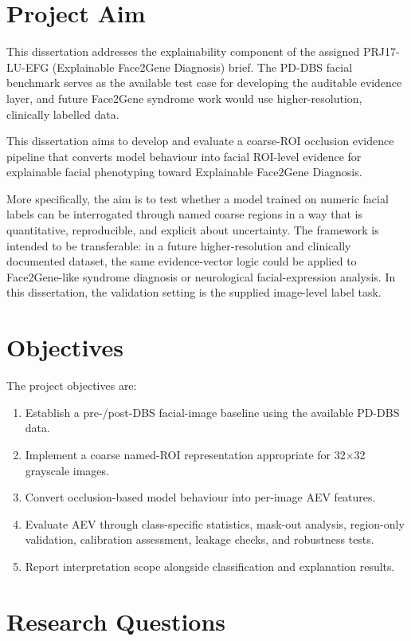 \section{Project Aim}

This dissertation addresses the explainability component of the assigned PRJ17-LU-EFG (Explainable Face2Gene Diagnosis) brief. The PD-DBS facial benchmark serves as the available test case for developing the auditable evidence layer, and future Face2Gene syndrome work would use higher-resolution, clinically labelled data.


This dissertation aims to develop and evaluate a coarse-ROI occlusion evidence pipeline that converts model behaviour into facial ROI-level evidence for explainable facial phenotyping toward Explainable Face2Gene Diagnosis.


More specifically, the aim is to test whether a model trained on numeric facial labels can be interrogated through named coarse regions in a way that is quantitative, reproducible, and explicit about uncertainty. The framework is intended to be transferable: in a future higher-resolution and clinically documented dataset, the same evidence-vector logic could be applied to Face2Gene-like syndrome diagnosis or neurological facial-expression analysis. In this dissertation, the validation setting is the supplied image-level label task.


\section{Objectives}

The project objectives are:


\begin{enumerate}
\item Establish a pre-/post-DBS facial-image baseline using the available PD-DBS data.
\item Implement a coarse named-ROI representation appropriate for 32$\times$32 grayscale images.
\item Convert occlusion-based model behaviour into per-image AEV features.
\item Evaluate AEV through class-specific statistics, mask-out analysis, region-only validation, calibration assessment, leakage checks, and robustness tests.
\item Report interpretation scope alongside classification and explanation results.
\end{enumerate}

\section{Research Questions}

